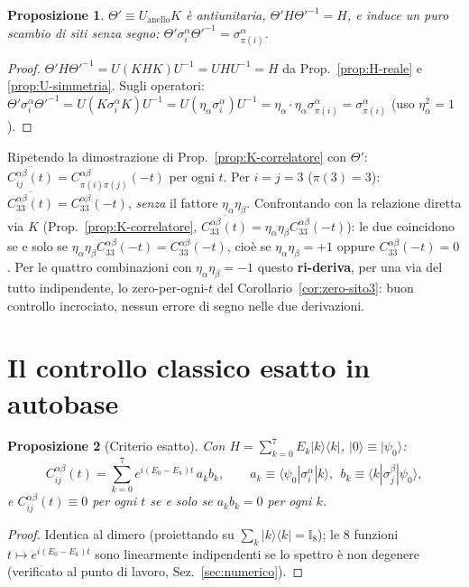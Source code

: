 \documentclass[11pt,a4paper]{article}
\newtheorem{proposizione}{Proposizione}
\newcommand{\ket}[1]{\lvert #1 \rangle}
\newcommand{\bra}[1]{\langle #1 \rvert}
\begin{document}
\begin{proposizione}
$\Theta'\equiv U_{\mathrm{anello}}K$ è antiunitaria, $\Theta'H\Theta'^{-1}=H$, e induce un puro
scambio di siti senza segno: $\Theta'\sigma_i^\alpha\Theta'^{-1}=\sigma_{\pi(i)}^\alpha$.
\end{proposizione}
\begin{proof}
$\Theta'H\Theta'^{-1}=U(KHK)U^{-1}=UHU^{-1}=H$ da Prop.~\ref{prop:H-reale} e
\ref{prop:U-simmetria}. Sugli operatori:
$\Theta'\sigma_i^\alpha\Theta'^{-1}=U(K\sigma_i^\alpha K)U^{-1}=U(\eta_\alpha\sigma_i^\alpha)U^{-1}
=\eta_\alpha\cdot\eta_\alpha\sigma_{\pi(i)}^\alpha=\sigma_{\pi(i)}^\alpha$ (uso $\eta_\alpha^2=1$).
\end{proof}
Ripetendo la dimostrazione di Prop.~\ref{prop:K-correlatore} con $\Theta'$:
$\overline{C_{ij}^{\alpha\beta}(t)}=C_{\pi(i)\pi(j)}^{\alpha\beta}(-t)$ per ogni $t$. Per
$i=j=3$ ($\pi(3)=3$): $\overline{C_{33}^{\alpha\beta}(t)}=C_{33}^{\alpha\beta}(-t)$, \emph{senza}
il fattore $\eta_\alpha\eta_\beta$. Confrontando con la relazione diretta via $K$
(Prop.~\ref{prop:K-correlatore}, $\overline{C_{33}^{\alpha\beta}(t)}=\eta_\alpha\eta_\beta
C_{33}^{\alpha\beta}(-t)$): le due coincidono se e solo se $\eta_\alpha\eta_\beta C_{33}^{\alpha\beta}(-t)=C_{33}^{\alpha\beta}(-t)$,
cioè se $\eta_\alpha\eta_\beta=+1$ oppure $C_{33}^{\alpha\beta}(-t)=0$. Per le quattro
combinazioni con $\eta_\alpha\eta_\beta=-1$ questo \textbf{ri-deriva}, per una via del tutto
indipendente, lo zero-per-ogni-$t$ del Corollario~\ref{cor:zero-sito3}: buon controllo
incrociato, nessun errore di segno nelle due derivazioni.

\section{Il controllo classico esatto in autobase}

\begin{proposizione}[Criterio esatto]
Con $H=\sum_{k=0}^7 E_k\ket k\bra k$, $\ket0\equiv\ket{\psi_0}$:
\begin{equation}
C_{ij}^{\alpha\beta}(t)=\sum_{k=0}^7 e^{i(E_0-E_k)t}\,a_k b_k,
\qquad a_k\equiv\langle\psi_0|\sigma_i^\alpha|k\rangle,\ \ b_k\equiv\langle k|\sigma_j^\beta|\psi_0\rangle,
\end{equation}
e $C_{ij}^{\alpha\beta}(t)\equiv0$ per ogni $t$ se e solo se $a_kb_k=0$ per ogni $k$.
\end{proposizione}
\begin{proof}
Identica al dimero (proiettando su $\sum_k\ket k\bra k=\mathbb I_8$); le $8$ funzioni
$t\mapsto e^{i(E_0-E_k)t}$ sono linearmente indipendenti se lo spettro è non degenere
(verificato al punto di lavoro, Sez.~\ref{sec:numerico}).
\end{proof}
\end{document}
